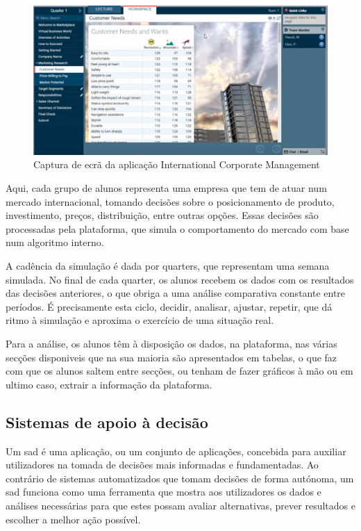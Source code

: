 \begin{figure}[h]
    \centering
    \includegraphics[width=\textwidth]{./img/marketplace1}
 \caption{Captura de ecrã da aplicação International Corporate Management}
 \end{figure}

Aqui, cada grupo de alunos representa uma empresa que tem de atuar num mercado internacional, tomando decisões sobre o posicionamento de produto, investimento, preços, distribuição, entre outras opções. Essas decisões são processadas pela plataforma, que simula o comportamento do mercado com base num algoritmo interno. 

A cadência da simulação é dada por quarters, que representam uma semana simulada. No final de cada quarter, os alunos recebem os dados com os resultados das decisões anteriores, o que obriga a uma análise comparativa constante entre períodos. É precisamente esta ciclo, decidir, analisar, ajustar, repetir, que dá ritmo à simulação e aproxima o exercício de uma situação real.

Para a análise, os alunos têm à disposição os dados, na plataforma,  nas várias secções disponiveis que na sua maioria são apresentados em tabelas, o que faz com que os alunos saltem entre secções, ou tenham de fazer gráficos à mão ou em ultimo caso, extrair a informação da plataforma. 

\subsection{Sistemas de apoio à decisão}
\label{sec:sad}

Um \gls{sad} é uma aplicação, ou um conjunto de aplicações, concebida para auxiliar utilizadores na tomada de decisões mais informadas e fundamentadas. Ao contrário de sistemas automatizados que tomam decisões de forma autónoma, um \gls{sad} funciona como uma ferramenta que mostra aos utilizadores os dados e análises necessárias para que estes possam avaliar alternativas, prever resultados e escolher a melhor ação possível.

